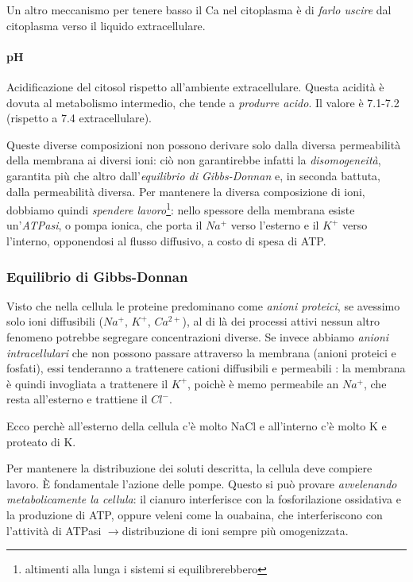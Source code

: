 \documentclass[a4paper,12pt]{article}
\newcommand{\lfreccia}{\ensuremath{\longrightarrow}}
\begin{document}
Un altro meccanismo per tenere basso il Ca nel citoplasma è di \emph{farlo uscire} dal citoplasma verso il liquido extracellulare.

\paragraph{pH}

Acidificazione del citosol rispetto all'ambiente extracellulare. Questa acidità è dovuta al metabolismo intermedio, che tende a \emph{produrre acido}. Il valore è 7.1-7.2 (rispetto a 7.4 extracellulare).

Queste diverse composizioni non possono derivare solo dalla diversa permeabilità della membrana ai diversi ioni: ciò non garantirebbe infatti la \emph{disomogeneità}, garantita più che altro dall'\emph{equilibrio di Gibbs-Donnan} e, in seconda battuta, dalla permeabilità diversa. Per mantenere la diversa composizione di ioni, dobbiamo quindi \emph{spendere lavoro}\footnote{altimenti alla lunga i sistemi si equilibrerebbero}: nello spessore della membrana esiste un'\emph{ATPasi}, o pompa ionica, che porta il $Na^{+}$ verso l'esterno e il $K^{+}$ verso l'interno, opponendosi al flusso diffusivo, a costo di spesa di ATP.

\subsubsection{Equilibrio di  Gibbs-Donnan}
Visto che nella cellula le proteine predominano come \emph{anioni proteici}, se avessimo solo ioni diffusibili ($Na^{+}$, $K^{+}$, $Ca^{2+}$), al di là dei processi attivi nessun altro fenomeno potrebbe segregare concentrazioni diverse. Se invece abbiamo \emph{anioni intracellulari} che non possono passare attraverso la membrana (anioni proteici e fosfati), essi tenderanno a trattenere cationi diffusibili e permeabili : la membrana è quindi invogliata a trattenere il $K^{+}$, poichè è memo permeabile an $Na^{+}$, che resta all'esterno e trattiene il $Cl^{-}$.

Ecco perchè all'esterno della cellula c'è molto NaCl e all'interno c'è molto K e proteato di K.

Per mantenere la distribuzione dei soluti descritta, la cellula deve compiere lavoro. È fondamentale l'azione delle pompe. Questo si può provare \emph{avvelenando metabolicamente la cellula}: il cianuro interferisce con la fosforilazione ossidativa e la produzione di ATP, oppure veleni come la ouabaina, che interferiscono con l'attività di ATPasi \lfreccia  distribuzione di ioni sempre più omogenizzata.
\end{document}
